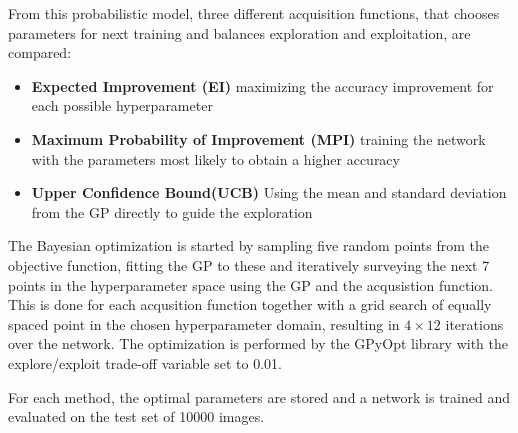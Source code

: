 \documentclass[12pt,fleqn]{article}
\begin{document}
\begin{multicols}{2}
From this probabilistic model, three different acquisition functions, that chooses parameters for next training and balances exploration and exploitation, are compared:

\begin{itemize}
	\item \textbf{Expected Improvement (EI)} maximizing the accuracy improvement for each possible hyperparameter
	\item \textbf{Maximum Probability of Improvement (MPI)} training the network with the parameters most likely to obtain a higher accuracy
	\item \textbf{Upper Confidence Bound(UCB)} Using the mean and standard deviation from the GP directly to guide the exploration
\end{itemize}
The Bayesian optimization is started by sampling five random points from the objective function, fitting the GP to these and iteratively surveying the next 7 points in the hyperparameter space using the GP and the acqusistion function. This is done for each acqusition function together with a grid search of equally spaced point in the chosen hyperparameter domain, resulting in \(4\times12\) iterations over the network. The optimization is performed by the GPyOpt library \cite{gpyopt} with the  explore/exploit trade-off variable set to 0.01.

For each method, the optimal parameters are stored and a network is trained and evaluated on the test set of 10000 images.

\end{multicols}
\vspace*{-0.3cm}
\end{document}
